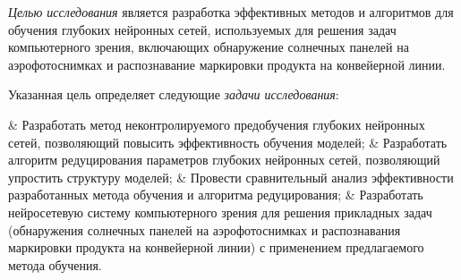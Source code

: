 \vspace{3mm}
\aim
\vspace{3mm}

\textit{Целью исследования} является разработка эффективных методов и алгоритмов для обучения глубоких нейронных сетей, используемых для решения задач компьютерного зрения, включающих обнаружение солнечных панелей на аэрофотоснимках и распознавание маркировки продукта на конвейерной линии.

Указанная цель определяет следующие \textit{задачи исследования}:
\begin{easylistNum}
	& Разработать метод неконтролируемого предобучения глубоких нейронных сетей, позволяющий повысить эффективность обучения моделей;
	& Разработать алгоритм редуцирования параметров глубоких нейронных сетей, позволяющий упростить структуру моделей;
	& Провести сравнительный анализ эффективности разработанных метода обучения и алгоритма редуцирования;
	& Разработать нейросетевую систему компьютерного зрения для решения прикладных задач (обнаружения солнечных панелей на аэрофотоснимках и распознавания маркировки продукта на конвейерной линии) с применением предлагаемого метода обучения.
\end{easylistNum}



